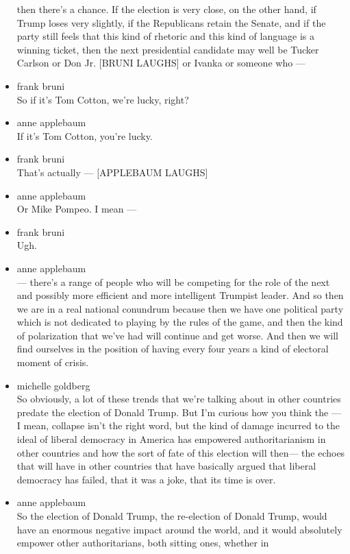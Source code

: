 \begin{itemize}
  then there's a chance. If the election is very close, on the other
  hand, if Trump loses very slightly, if the Republicans retain the
  Senate, and if the party still feels that this kind of rhetoric and
  this kind of language is a winning ticket, then the next presidential
  candidate may well be Tucker Carlson or Don Jr. {[}BRUNI LAUGHS{]} or
  Ivanka or someone who ---
\item
  frank bruni\\
  So if it's Tom Cotton, we're lucky, right?
\item
  anne applebaum\\
  If it's Tom Cotton, you're lucky.
\item
  frank bruni\\
  That's actually --- {[}APPLEBAUM LAUGHS{]}
\item
  anne applebaum\\
  Or Mike Pompeo. I mean ---
\item
  frank bruni\\
  Ugh.
\item
  anne applebaum\\
  --- there's a range of people who will be competing for the role of
  the next and possibly more efficient and more intelligent Trumpist
  leader. And so then we are in a real national conundrum because then
  we have one political party which is not dedicated to playing by the
  rules of the game, and then the kind of polarization that we've had
  will continue and get worse. And then we will find ourselves in the
  position of having every four years a kind of electoral moment of
  crisis.
\item
  michelle goldberg\\
  So obviously, a lot of these trends that we're talking about in other
  countries predate the election of Donald Trump. But I'm curious how
  you think the --- I mean, collapse isn't the right word, but the kind
  of damage incurred to the ideal of liberal democracy in America has
  empowered authoritarianism in other countries and how the sort of fate
  of this election will then--- the echoes that will have in other
  countries that have basically argued that liberal democracy has
  failed, that it was a joke, that its time is over.
\item
  anne applebaum\\
  So the election of Donald Trump, the re-election of Donald Trump,
  would have an enormous negative impact around the world, and it would
  absolutely empower other authoritarians, both sitting ones, whether in

\end{itemize}
